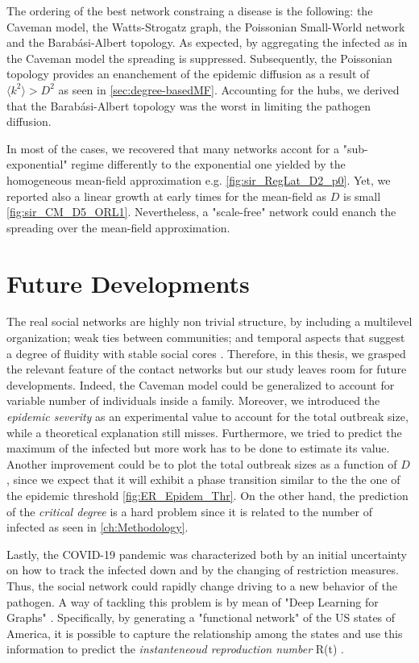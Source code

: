 \documentclass[a4paper,10pt,twoside]{book} %
\theoremstyle{definition}
\begin{document}
The ordering of the best network constraing a disease is the following: the Caveman model, the Watts-Strogatz graph, the Poissonian Small-World network and the Barabási-Albert topology. As expected, by aggregating the infected as in the Caveman model the spreading is suppressed. Subsequently, the Poissonian topology provides an enanchement of the epidemic diffusion as a result of $ \langle k^2 \rangle > D^{2}$ as seen in \autoref{sec:degree-basedMF}. Accounting for the hubs, we derived that the Barabási-Albert topology was the worst in limiting the pathogen diffusion.

In most of the cases, we recovered that many networks accont for a "sub-exponential" regime differently to the exponential one yielded by the homogeneous mean-field approximation e.g. \autoref{fig:sir_RegLat_D2_p0}. Yet, we reported also a linear growth at early times for the mean-field as $ D$ is small \autoref{fig:sir_CM_D5_ORL1}. Nevertheless, a "scale-free" network could enanch the spreading over the mean-field approximation.

\section{Future Developments}
The real social networks are highly non trivial structure, by including a multilevel organization; weak ties between communities; and temporal aspects that suggest a degree of fluidity with stable social cores \cite{Thurner::NetBasedExpl}. Therefore, in this thesis, we grasped the relevant feature of the contact networks but our study leaves room for future developments. Indeed, the Caveman model could be generalized to account for variable number of individuals inside a family. Moreover, we introduced the \textit{epidemic severity} as an experimental value to account for the total outbreak size, while a theoretical explanation still misses. Furthermore, we tried to predict the maximum of the infected but more work has to be done to estimate its value. Another improvement could be to plot the total outbreak sizes as a function of $ D$, since we expect that it will exhibit a phase transition similar to the the one of the epidemic threshold \autoref{fig:ER_Epidem_Thr}. On the other hand, the prediction of the \textit{critical degree} is a hard problem since it is related to the number of infected as seen in \autoref{ch:Methodology}. 

Lastly, the COVID-19 pandemic was characterized both by an initial uncertainty on how to track the infected down and by the changing of restriction measures. Thus, the social network could rapidly change driving to a new behavior of the pathogen. A way of tackling this problem is by mean of "Deep Learning for Graphs" \cite{Bacciu_Micheli:2020_IntroDGNPisa}. Specifically, by generating a "functional network" of the US states of America, it is possible to capture the relationship among the states and use this information to predict the \textit{instanteneoud reproduction number} R(t) \cite{Davahli::USA_predicting_COVID19}.
\end{document}

